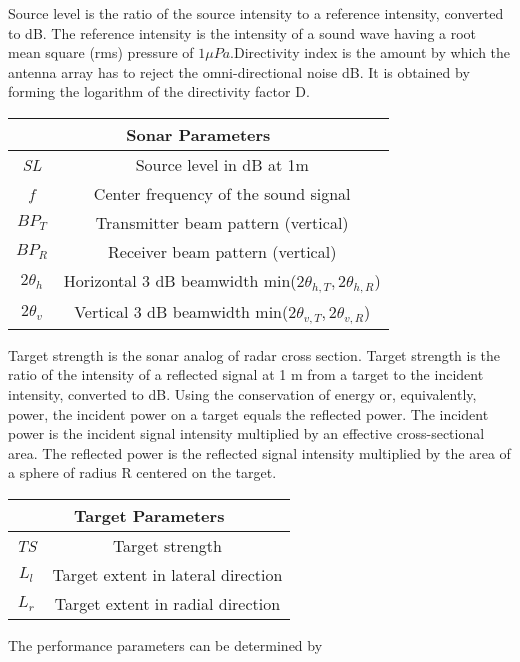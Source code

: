 \noindent Source level is the ratio of the source intensity to a reference intensity, converted to dB. The reference intensity is the intensity of a sound wave having a root mean square (rms) pressure of $1 \mu Pa.$Directivity index is the amount by which the antenna array has to reject the omni-directional noise dB. It is obtained by forming the logarithm of the directivity factor D.
\begin{center}
\begin{tabular}{ |c|c| } 
 \hline
 \multicolumn{2}{|c|}{Sonar Parameters} \\
 \hline
  \textit{SL} & Source level in dB at 1m  \\ 
  \textit{f} & Center frequency of the sound signal  \\ 
  \textit{$BP_T$} & Transmitter beam pattern (vertical)  \\ 
  \textit{$BP_R$} & Receiver beam pattern (vertical)  \\ 
  $2 \theta_{h}$ & Horizontal 3 dB beamwidth min($2\theta_{h,T}, 2\theta_{h,R}$) \\
   $2 \theta_{v}$ & Vertical 3 dB beamwidth min($2\theta_{v,T}, 2\theta_{v,R}$) \\
  \hline
\end{tabular}
\end{center}

\noindent Target strength is the sonar analog of radar cross section. Target strength is the ratio of the intensity of a reflected signal at 1 m from a target to the incident intensity, converted to dB. Using the conservation of energy or, equivalently, power, the incident power on a target equals the reflected power. The incident power is the incident signal intensity multiplied by an effective cross-sectional area. The reflected power is the reflected signal intensity multiplied by the area of a sphere of radius R centered on the target. 
\begin{center}
\begin{tabular}{ |c|c| } 
 \hline
 \multicolumn{2}{|c|}{Target Parameters} \\
 \hline
  \textit{TS} & Target strength  \\ 
  \textit{$L_l$} & Target extent in lateral direction \\ 
  \textit{$L_r$} & Target extent in radial direction \\ 
  \hline
\end{tabular}
\end{center}

\noindent The performance parameters can be determined by
